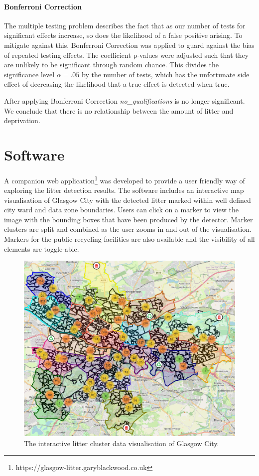 \documentclass{thesis}
\begin{document}
\subsubsection{Bonferroni Correction}

The multiple testing problem describes the fact that as our number of tests for significant effects increase, so does the likelihood of a false positive arising. To mitigate against this, Bonferroni Correction was applied to guard against the bias of repeated testing effects. The coefficient p-values were adjusted such that they are unlikely to be significant through random chance. This divides the significance level $\alpha = .05$ by the number of tests, which has the unfortunate side effect of decreasing the likelihood that a true effect is detected when true.

After applying Bonferroni Correction \textit{no\_qualifications} is no longer significant. We conclude that there is no relationship between the amount of litter and deprivation.

\chapter{Software}

A companion web application\footnote{https://glasgow-litter.garyblackwood.co.uk} was developed to provide a user friendly way of exploring the litter detection results. The software includes an interactive map visualisation of Glasgow City with the detected litter marked within well defined city ward and data zone boundaries. Users can click on a marker to view the image with the bounding boxes that have been produced by the detector. Marker clusters are split and combined as the user zooms in and out of the visualisation. Markers for the public recycling facilities are also available and the visibility of all elements are toggle-able.

\begin{figure}[h]
    \centering
    \includegraphics[scale=0.55]{images/glasgow-city.PNG}
    \caption{The interactive litter cluster data visualisation of Glasgow City.}
\end{figure}
\end{document}
